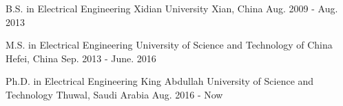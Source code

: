 

%	
%
%
		
\begin{cventries}

  \eduentry
	{B.S. in Electrical Engineering} %
	{Xidian University} %
	{Xian, China} %
	{Aug. 2009 - Aug. 2013} %
	{}

  \eduentry
	{M.S. in Electrical Engineering} %
	{University of Science and Technology of China} %
	{Hefei, China} %
	{Sep. 2013 - June. 2016} %
	{}

  \eduentry
	{Ph.D. in Electrical Engineering} %
	{King Abdullah University of Science and Technology} %
	{Thuwal, Saudi Arabia} %
	{Aug. 2016 - Now} %
	{}
    


\end{cventries}
